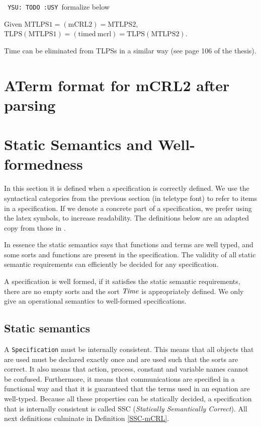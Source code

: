 \documentclass[fleqn,a4paper]{article}
\def\YSU{\texttt{ YSU: TODO :USY\marginpar{!!!} }}
\begin{document}
\YSU formalize below

\begin{thm}
  Given
  $\mathrm{MTLPS1}=(\mathrm{mCRL2})=\mathrm{MTLPS2}$,\\
  $\mathrm{TLPS(MTLPS1)}=(\mathrm{timed\ mcrl})=\mathrm{TLPS(MTLPS2)}$.
\end{thm}

Time can be eliminated from TLPSs in a similar way (see page 106 of
the thesis).

\appendix
\newpage
\section{ATerm format for mCRL2 after parsing}

\section{Static Semantics and Well-formedness}
\label{section:SSC}
In this section it is defined when a specification is correctly defined.
We use the syntactical categories from the previous section (in teletype
font) to refer to items in a specification. If we denote a
concrete part of a specification, we prefer using the latex symbols, to
increase readability. The definitions below are an adapted copy from those in
\cite{GroPo94a}.

In
essence the static semantics says that functions and terms are well
typed, and some sorts and functions are present in the specification. The
validity of all static semantic requirements can efficiently be decided for any
specification.

A specification is well formed, if it satisfies the static semantic requirements,
there are no empty sorts and the sort $\mathit{Time}$ is appropriately defined. We
only give an operational semantics to well-formed specifications.

\subsection{Static semantics}
A {\tt Specification} must be internally consistent. This means
that all objects that are used must be declared exactly once and
are used such that the sorts are correct. It also means that action,
process, constant and variable names cannot be confused.
Furthermore, it means that communications are specified in a functional
way and that it is guaranteed that the terms used in an equation are well-typed.
Because all these properties can be statically decided, a
specification that is internally consistent is called SSC
({\em Statically Semantically Correct}). All next definitions
culminate in Definition \ref{SSC-mCRL}.
\end{document}
